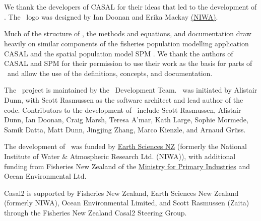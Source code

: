 \section{\label{sec:acknowledgements}}

We thank the developers of CASAL \citep{1388} for their ideas that led to the development of \CNAME. The \CNAME\ logo was designed by Ian Doonan and Erika Mackay \href{http://www.niwa.co.nz}{(NIWA)}.

Much of the structure of \CNAME, the methods and equations, and documentation draw heavily on similar components of the fisheries population modelling application CASAL \citep{1388} and  the spatial population model SPM \citep{SPM}. We thank the authors of CASAL and SPM for their permission to use their work as the basis for parts of \CNAME\ and allow the use of the definitions, concepts, and documentation.

The \CNAME\ project is maintained by the \CNAME\ Development Team. \CNAME\ was initiated by Alistair Dunn, with Scott Rasmussen as the software architect and lead author of the code. Contributors to the development of \CNAME\ include Scott Rasmussen, Alistair Dunn, Ian Doonan, Craig Marsh, Teresa A'mar, Kath Large, Sophie Mormede, Samik Datta, Matt Dunn, Jingjing Zhang, Marco Kienzle, and Arnaud Gr\"uss.

The development of \CNAME\ was funded by \href{https://www.earthsciences.nz/}{Earth Sciences NZ} (formerly the National Institute of Water \& Atmospheric Research Ltd. (NIWA)), with additional funding from Fisheries New Zealand of the \href{http://www.mpi.govt.nz}{Ministry for Primary Industries} and Ocean Environmental Ltd.

Casal2 is supported by Fisheries New Zealand, Earth Sciences New Zealand (formerly NIWA), Ocean Environmental Limited, and Scott Rasmussen (Zaita) through the Fisheries New Zealand Casal2 Steering Group.

